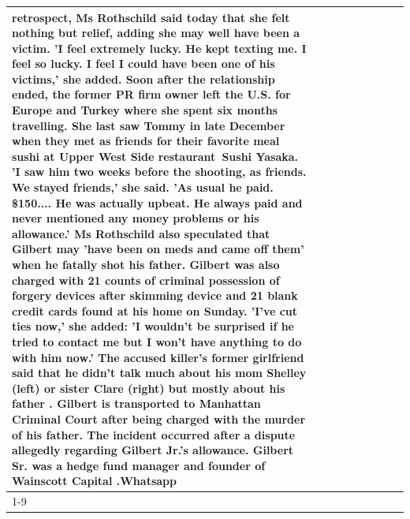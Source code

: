 \begin{table}[H]
\begin{tabular}{lllrlllll}
retrospect, Ms Rothschild said today that she felt nothing but relief, adding she may well have been a victim. 'I feel extremely lucky. He kept texting me. I feel so lucky. I feel I could have been one of his victims,' she added. Soon after the relationship ended, the former PR firm owner left the U.S. for Europe and Turkey where she spent six months  travelling. She last saw Tommy in late December when they met as friends for their favorite meal sushi at Upper West Side restaurant Sushi Yasaka. 'I saw him two weeks before the shooting, as friends. We stayed friends,' she said. 'As usual he paid. \$150.... He was actually upbeat. He always paid and never mentioned any money problems or his allowance.' Ms Rothschild also speculated that Gilbert may 'have been on meds and came off them' when he fatally shot his father. Gilbert was also charged with 21 counts of criminal possession of forgery devices after skimming device and 21 blank credit cards found at his home on Sunday. 'I've cut ties now,' she added: 'I wouldn’t be surprised if he tried to contact me but I won’t have anything to do with him now.' The accused killer's former girlfriend said that he didn't talk much about his mom Shelley (left) or sister Clare (right) but mostly about his father . Gilbert is transported to Manhattan Criminal Court  after being charged with the murder of his father. The incident occurred after a dispute allegedly regarding Gilbert Jr.'s allowance. Gilbert Sr. was a hedge fund manager and founder of Wainscott Capital .Whatsapp \\
\cline{1-9}

\end{tabular}
\end{table}
